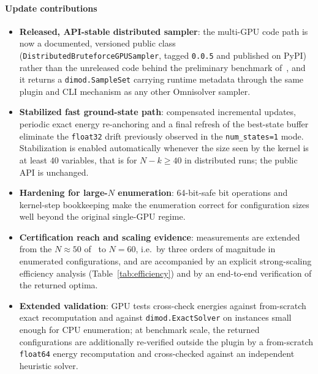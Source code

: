 \documentclass[preprint,12pt,a4paper]{elsarticle}
\begin{document}
\paragraph{Update contributions}
\begin{itemize}
    \item \textbf{Released, API-stable distributed sampler}: the multi-GPU code
    path is now a documented, versioned public class
    (\texttt{DistributedBruteforceGPUSampler}, tagged \texttt{0.0.5} and
    published on PyPI) rather than the unreleased code behind the preliminary
    benchmark of~\cite{jalowiecki2021omnisolver}, and it returns a
    \texttt{dimod.SampleSet} carrying runtime metadata through the same plugin
    and CLI mechanism as any other Omnisolver sampler.
    \item \textbf{Stabilized fast ground-state path}: compensated incremental
    updates, periodic exact energy re-anchoring and a final refresh of the
    best-state buffer eliminate the \texttt{float32} drift previously observed
    in the \texttt{num\_states=1} mode. Stabilization is enabled automatically
    whenever the size seen by the kernel is at least $40$ variables, that is for
    $N-k \geq 40$ in distributed runs; the public API is unchanged.
    \item \textbf{Hardening for large-$N$ enumeration}: 64-bit-safe bit
    operations and kernel-step bookkeeping make the enumeration correct for
    configuration sizes well beyond the original single-GPU regime.
    \item \textbf{Certification reach and scaling evidence}: measurements are
    extended from the $N\approx 50$ of~\cite{jalowiecki2021omnisolver} to
    $N=60$, i.e.\ by three orders of magnitude in enumerated configurations, and
    are accompanied by an explicit strong-scaling efficiency analysis
    (Table~\ref{tab:efficiency}) and by an end-to-end verification of the
    returned optima.
    \item \textbf{Extended validation}: GPU tests cross-check energies against
    from-scratch exact recomputation and against \texttt{dimod.ExactSolver} on
    instances small enough for CPU enumeration; at benchmark scale, the returned
    configurations are additionally re-verified outside the plugin by a
    from-scratch \texttt{float64} energy recomputation and cross-checked against
    an independent heuristic solver.
\end{itemize}
\end{document}

